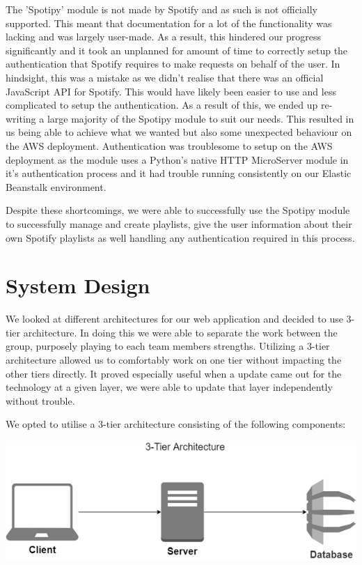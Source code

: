 The 'Spotipy' module is not made by Spotify and as such is not officially supported. This meant that documentation for a lot of the functionality was lacking and was largely user-made. As a result, this hindered our progress significantly and it took an unplanned for amount of time to correctly setup the authentication that Spotify requires to make requests on behalf of the user. In hindsight, this was a mistake as we didn't realise that there was an official JavaScript API for Spotify. 
This would have likely been easier to use and less complicated to setup the authentication. As a result of this, we ended up re-writing a large majority of the Spotipy module to suit our needs. This resulted in us being able to achieve what we wanted but also some unexpected behaviour on the AWS deployment. Authentication was troublesome to setup on the AWS deployment as the module uses a Python's native HTTP MicroServer module in it's authentication process and it had trouble running consistently on our Elastic Beanstalk environment.

Despite these shortcomings, we were able to successfully use the Spotipy module to successfully manage and create playlists, give the user information about their own Spotify playlists as well handling any authentication required in this process.


\chapter{System Design}
We looked at different architectures for our web application and decided to use 3-tier architecture. In doing this we were able to separate the work between the group, purposely playing to each team members strengths. Utilizing a 3-tier architecture allowed us to comfortably work on one tier without impacting the other tiers directly. It proved especially useful when a update came out for the technology at a given layer, we were able to update that layer independently without trouble.


We opted to utilise a 3-tier architecture consisting of the following components:

\begin{center}    
	\includegraphics{img/3tier.png}
\end{center}

